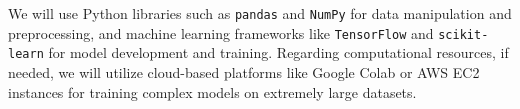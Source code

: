 \documentclass[12pt, letterpaper]{article}
\begin{document}
\begin{enumerate}[label=]
We will use Python libraries such as \texttt{pandas} and \texttt{NumPy} for data manipulation and preprocessing, and machine learning frameworks like \texttt{TensorFlow} and \texttt{scikit-learn} for model development and training. Regarding computational resources, if needed, we will utilize cloud-based platforms like Google Colab or AWS EC2 instances for training complex models on extremely large datasets. 

    





    
\end{enumerate}
\end{document}
